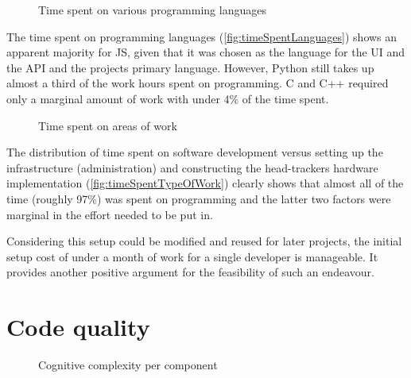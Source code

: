 \begin{figure}[h]
\centering

\caption[Time spent on languages]{Time spent on various programming languages\protect}
\label{fig:timeSpentLanguages}
\end{figure}

The time spent on programming languages (\autoref{fig:timeSpentLanguages}) shows an apparent majority for \ac{JS}, given that it was chosen as the language for the \ac{UI} and the \ac{API} and the project\textquotesingle s primary language.
However, Python still takes up almost a third of the work hours spent on programming.
C and C++ required only a marginal amount of work with under 4\% of the time spent.

\begin{figure}[h]
\centering

\caption[Time spent on areas of work]{Time spent on areas of work\protect}
\label{fig:timeSpentTypeOfWork}
\end{figure}

The distribution of time spent on software development versus setting up the infrastructure (administration) and constructing the head-tracker\textquotesingle s hardware implementation (\autoref{fig:timeSpentTypeOfWork}) clearly shows that almost all of the time (roughly 97\%) was spent on programming and the latter two factors were marginal in the effort needed to be put in.

Considering this setup could be modified and reused for later projects, the initial setup cost of under a month of work for a single developer is manageable.
It provides another positive argument for the feasibility of such an endeavour.

\section{Code quality}
\label{sec:code-quality}

\begin{figure}[h]
\centering

\caption[Cognitive complexity]{Cognitive complexity per component\protect}
\label{fig:cognitiveComplexity}
\end{figure}


